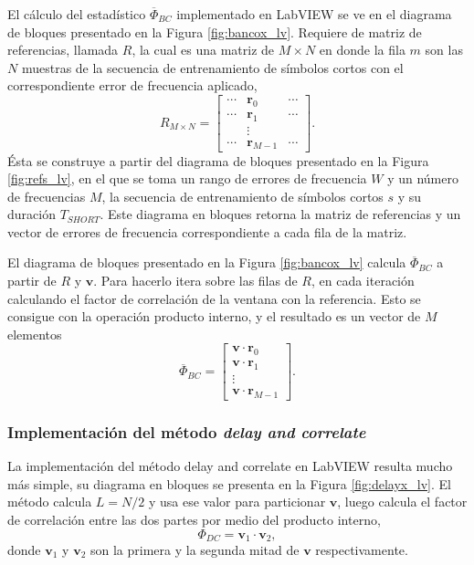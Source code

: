 El cálculo del estadístico $\overline{\Phi}_{BC}$ implementado en LabVIEW se ve en el diagrama de bloques presentado en la Figura \ref{fig:bancox_lv}. Requiere de matriz de referencias, llamada $R$, la cual es una matriz de $M \times N$ en donde la fila $m$ son las $N$ muestras de la secuencia de entrenamiento de símbolos cortos con el correspondiente error de frecuencia aplicado,
\begin{equation}
    R_{M\times N} = \begin{bmatrix}
       \cdots & \mathbf{r}_{0} & \cdots\\
       \cdots & \mathbf{r}_{1} & \cdots\\
       & \vdots & \\
       \cdots & \mathbf{r}_{M-1} & \cdots
    \end{bmatrix}.
\end{equation}
Ésta se construye a partir del diagrama de bloques presentado en la Figura \ref{fig:refs_lv}, en el que se toma un rango de errores de frecuencia $W$ y un número de frecuencias $M$, la secuencia de entrenamiento de símbolos cortos $s$ y su duración $T_{SHORT}$. Este diagrama en bloques retorna la matriz de referencias y un vector de errores de frecuencia correspondiente a cada fila de la matriz.

El diagrama de bloques presentado en la Figura \ref{fig:bancox_lv} calcula $\overline{\Phi}_{BC}$ a partir de $R$ y $\mathbf{v}$. Para hacerlo itera sobre las filas de $R$, en cada iteración calculando el factor de correlación de la ventana con la referencia. Esto se consigue con la operación producto interno, y el resultado es un vector de $M$ elementos
\begin{equation}
    \overline{\Phi}_{BC} = \begin{bmatrix}
        \mathbf{v} \cdot \mathbf{r}_{0}\\
        \mathbf{v} \cdot \mathbf{r}_{1}\\
        \vdots\\
        \mathbf{v} \cdot \mathbf{r}_{M-1}
    \end{bmatrix}.
\end{equation}

\subsubsection{Implementación del método \textit{delay and correlate}}

La implementación del método delay and correlate en LabVIEW resulta mucho más simple, su diagrama en bloques se presenta en la Figura \ref{fig:delayx_lv}. El método calcula $L = N/2$ y usa ese valor para particionar $\mathbf{v}$, luego calcula el factor de correlación entre las dos partes por medio del producto interno,
\begin{equation}\textstyle
    \Phi_{DC} = \mathbf{v}_1 \cdot \mathbf{v}_2,
\end{equation}
donde $\mathbf{v}_1$ y $\mathbf{v}_2$ son la primera y la segunda mitad de $\mathbf{v}$ respectivamente.

